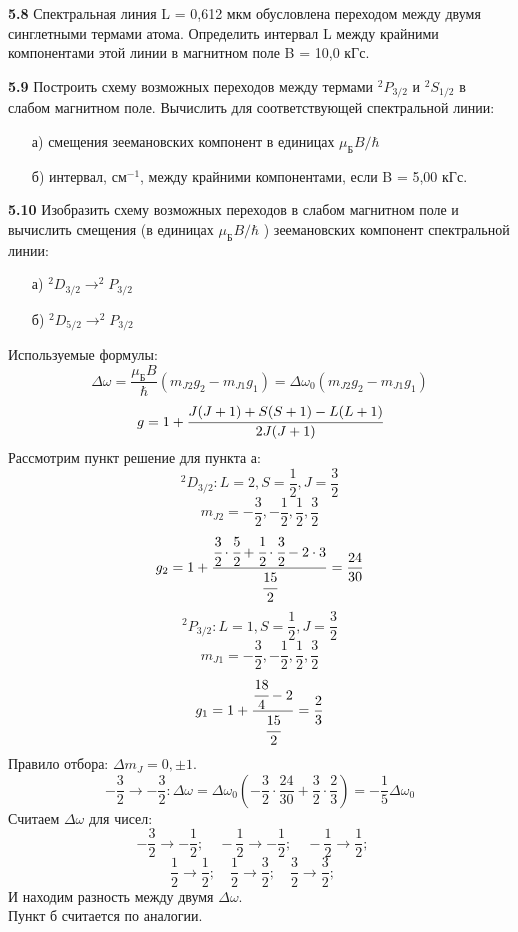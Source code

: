 	\textbf{5.8 }
		Спектральная линия L = 0,612 мкм обусловлена переходом между двумя
		синглетными термами атома. Определить интервал L между крайними
		компонентами этой линии в магнитном поле B = 10,0 кГс.

	\textbf{5.9 }
		Построить схему возможных переходов между термами \( ^2P_{3/2} \) и 
		\( ^2S_{1/2} \) в слабом магнитном поле. Вычислить для соответствующей 
		спектральной линии:
		\vspace*{-2em}
		\begin{itemize}\itemsep-8pt
			\item[а)] смещения зеемановских компонент в единицах 
			\( \mu_\text{Б}B/\hbar \)
			\item[б)] интервал, \( \text{см}^{-1} \), между крайними 
			компонентами, если B = 5,00 кГс.
		\end{itemize}

	\textbf{5.10 }
		Изобразить схему возможных переходов в слабом магнитном поле и
		вычислить смещения (в единицах \( \mu_\text{Б}B/\hbar \) ) 
		зеемановских компонент спектральной линии: 
		\vspace*{-1em}
		\begin{itemize}\itemsep-8pt
			\item[а)] \( ^2D_{3/2} \rightarrow ^2P_{3/2} \)
			\item[б)] \( ^2D_{5/2} \rightarrow ^2P_{3/2} \)
		\end{itemize}
		Используемые формулы: 
		\[ 
			\Delta\omega = \frac{\mu_\text{Б}B}{\hbar}(m_{J2}g_2 - m_{J1}g_1)
			= \Delta\omega_0 (m_{J2}g_2 - m_{J1}g_1)
		\]
		\[ g = 1 + \cfrac{J(J+1)+S(S+1)-L(L+1)}{2J(J+1)} \]
		Рассмотрим пункт решение для пункта а:
		\[ ^2D_{3/2}: L=2, S=\frac{1}{2}, J=\frac{3}{2} \]
		\[ m_{J2} = -\frac{3}{2}, -\frac{1}{2}, \frac{1}{2}, \frac{3}{2} \]
		\[ 
			g_2 = 1 + \frac{\cfrac{3}{2}\cdot\cfrac{5}{2} 
			+ \cfrac{1}{2}\cdot\cfrac{3}{2} - 2\cdot3}{\cfrac{15}{2}} 
			= \frac{24}{30}
		\]
		\[ ^2P_{3/2}: L=1, S=\frac{1}{2}, J=\frac{3}{2} \]
		\[ m_{J1} = -\frac{3}{2}, -\frac{1}{2}, \frac{1}{2}, \frac{3}{2} \]
		\[ g_1 = 1 + \frac{\cfrac{18}{4} - 2}{\cfrac{15}{2}} = \frac{2}{3} \]
		Правило отбора: \( \Delta m_J = 0, \pm1 \).
		\[ -\frac{3}{2} \rightarrow -\frac{3}{2}: 
			\Delta\omega = \Delta\omega_0 (-\frac{3}{2}\cdot\frac{24}{30} 
			+ \frac{3}{2}\cdot\frac{2}{3}) = -\frac{1}{5}\Delta\omega_0 
		\]
		Считаем \( \Delta\omega \) для чисел:
		\[ 
			-\frac{3}{2} \rightarrow -\frac{1}{2};\quad
			-\frac{1}{2} \rightarrow -\frac{1}{2};\quad
			-\frac{1}{2} \rightarrow \frac{1}{2};\quad
		\]
		\[ 
			\frac{1}{2} \rightarrow \frac{1}{2};\quad
			\frac{1}{2} \rightarrow \frac{3}{2};\quad
			\frac{3}{2} \rightarrow \frac{3}{2};\quad
		\]
		И находим разность между двумя \( \Delta\omega \). \\
		Пункт б считается по аналогии.

